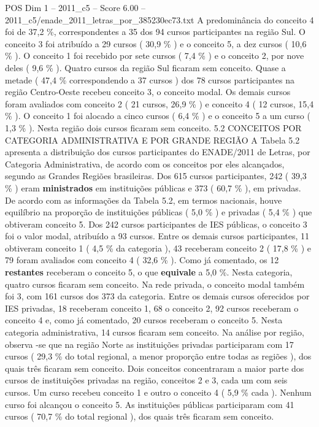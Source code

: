 \begin{textsample}{POS Dim 1 – 2011\_c5 – Score 6.00 – 2011\_c5/enade\_2011\_letras\_por\_385230ec73.txt}
A predominância do conceito 4 foi de 37,2 \%, correspondentes a 35 dos 94 cursos participantes na região Sul.
O conceito 3 foi atribuído a 29 cursos ( 30,9 \% ) e o conceito 5, a dez cursos ( 10,6 \% ).
O conceito 1 foi recebido por sete cursos ( 7,4 \% ) e o conceito 2, por nove deles ( 9,6 \% ).
Quatro cursos da região Sul ficaram sem conceito.
Quase a metade ( 47,4 \% correspondendo a 37 cursos ) dos 78 cursos participantes na região Centro-Oeste recebeu conceito 3, o conceito modal.
Os demais cursos foram avaliados com conceito 2 ( 21 cursos, 26,9 \% ) e conceito 4 ( 12 cursos, 15,4 \% ).
O conceito 1 foi alocado a cinco cursos ( 6,4 \% ) e o conceito 5 a um curso ( 1,3 \% ).
Nesta região dois cursos ficaram sem conceito. 5.2 CONCEITOS POR CATEGORIA ADMINISTRATIVA E POR GRANDE REGIÃO A Tabela 5.2 apresenta a distribuição dos cursos participantes do ENADE/2011 de Letras, por Categoria Administrativa, de acordo com os conceitos por eles alcançados, segundo as Grandes Regiões brasileiras.
Dos 615 cursos participantes, 242 ( 39,3 \% ) eram \textbf{ministrados} em instituições públicas e 373 ( 60,7 \% ), em privadas.
De acordo com as informações da Tabela 5.2, em termos nacionais, houve equilíbrio na proporção de instituições públicas ( 5,0 \% ) e privadas ( 5,4 \% ) que obtiveram conceito 5.
Dos 242 cursos participantes de IES públicas, o conceito 3 foi o valor modal, atribuído a 93 cursos.
Entre os demais cursos participantes, 11 obtiveram conceito 1 ( 4,5 \% da categoria ), 43 receberam conceito 2 ( 17,8 \% ) e 79 foram avaliados com conceito 4 ( 32,6 \% ).
Como já comentado, os 12 \textbf{restantes} receberam o conceito 5, o que \textbf{equivale} a 5,0 \%.
Nesta categoria, quatro cursos ficaram sem conceito.
Na rede privada, o conceito modal também foi 3, com 161 cursos dos 373 da categoria.
Entre os demais cursos oferecidos por IES privadas, 18 receberam conceito 1, 68 o conceito 2, 92 cursos receberam o conceito 4 e, como já comentado, 20 cursos receberam o conceito 5.
Nesta categoria administrativa, 14 cursos ficaram sem conceito.
Na análise por região, observa -se que na região Norte as instituições privadas participaram com 17 cursos ( 29,3 \% do total regional, a menor proporção entre todas as regiões ), dos quais três ficaram sem conceito.
Dois conceitos concentraram a maior parte dos cursos de instituições privadas na região, conceitos 2 e 3, cada um com seis cursos.
Um curso recebeu conceito 1 e outro o conceito 4 ( 5,9 \% cada ).
Nenhum curso foi alcançou o conceito 5.
As instituições públicas participaram com 41 cursos ( 70,7 \% do total regional ), dos quais três ficaram sem conceito.

\end{textsample}
